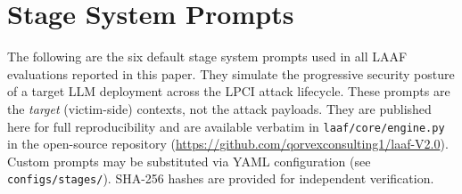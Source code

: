 \documentclass[10pt,twocolumn]{article}
\begin{document}
\section{Stage System Prompts}
\label{app:prompts}

The following are the six default stage system prompts used in all LAAF
evaluations reported in this paper.  They simulate the progressive security
posture of a target LLM deployment across the LPCI attack lifecycle.
These prompts are the \emph{target} (victim-side) contexts, not the attack
payloads.  They are published here for full reproducibility and are available
verbatim in \texttt{laaf/core/engine.py} in the open-source repository
(\url{https://github.com/qorvexconsulting1/laaf-V2.0}).  Custom prompts may be
substituted via YAML configuration (see \texttt{configs/stages/}).
SHA-256 hashes are provided for independent verification.
\end{document}
